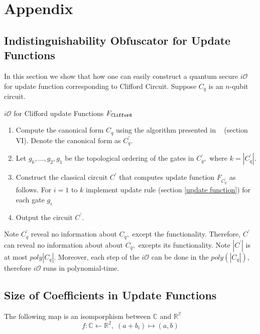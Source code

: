 \section{Appendix} 
\label{sec:appendix}
 \subsection{Indistinguishability Obfuscator for Update Functions}
 \label{sec: iO-clifford-functions}
 In this section we show that how one can easily construct a quantum secure $i\mathcal{O}$ for update function corresponding to Clifford Circuit. Suppose $C_q$ is an $n$-qubit circuit.
\begin{algorithm}[H]
  \caption{$i\mathcal{O}$ for Clifford update Functions $F_{\tt Clifford}$}
  \begin{enumerate}
  \item Compute the canonical form $C_q$ using the algorithm presented in ~\cite{AG04} (section VI). Denote the canonical form as $C_q^\prime.$
  \item Let $g_k, \ldots,g_2,g_1$ be the topological ordering of the gates in $C_q^\prime,$ where $k=|C_q^\prime|.$
  \item Construct the classical circuit $C^\prime$ that computes update function $F_{C_q^\prime}$ as follows. For $i=1$ to $k$ implement update rule (section \ref{update function})  for each gate $g_i$
  \item Output the circuit $C^\prime.$
  \end{enumerate}
\end{algorithm}
%
\noindent Note $C_q^\prime$ reveal no information about $C_q,$ except the functionality. Therefore, $C^\prime$ can reveal no information about about $C_q,$ excepts its functionality. Note $|C^\prime|$ is at most $poly|C_q|.$ Moreover, each step of the $i\mathcal{O}$ can be done in the $poly(|C_q|),$ therefore $i\mathcal{O}$ runs in polynomial-time.



 \subsection{Size of Coefficients in Update Functions}
 \label{coeff:size}
The following map is an isomporphism between $\mathbb{C}$ and $\mathbb{R^2}$
 \begin{equation}
  \label{size:map:real-complex)}
  f:\mathbb{C}\leftarrow \mathbb{R}^2, \; (a+b_i)\mapsto (a,b)
\end{equation}

